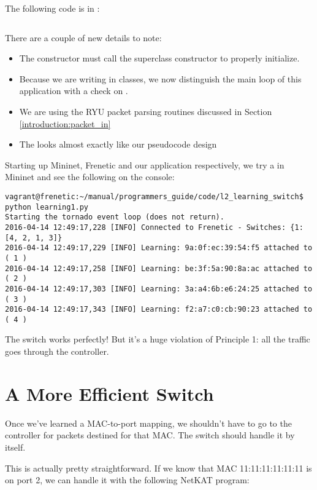 The following code is in :

\inputminted[linenos]{python}{code/l2_learning_switch/learning1.py}

There are a couple of new details to note:

\begin{itemize}
\item The  constructor must call the superclass constructor to properly initialize.
\item Because we are writing in classes, we now distinguish the main loop of this application with 
a check on .  
\item We are using the RYU packet parsing routines discussed in Section \ref{introduction:packet_in}
\item The  looks almost exactly like our pseudocode design
\end{itemize}

Starting up Mininet, Frenetic and our application respectively, we try a  in Mininet and see
the following on the console:

\begin{verbatim}
vagrant@frenetic:~/manual/programmers_guide/code/l2_learning_switch$ python learning1.py
Starting the tornado event loop (does not return).
2016-04-14 12:49:17,228 [INFO] Connected to Frenetic - Switches: {1: [4, 2, 1, 3]}
2016-04-14 12:49:17,229 [INFO] Learning: 9a:0f:ec:39:54:f5 attached to ( 1 )
2016-04-14 12:49:17,258 [INFO] Learning: be:3f:5a:90:8a:ac attached to ( 2 )
2016-04-14 12:49:17,303 [INFO] Learning: 3a:a4:6b:e6:24:25 attached to ( 3 )
2016-04-14 12:49:17,343 [INFO] Learning: f2:a7:c0:cb:90:23 attached to ( 4 )
\end{verbatim}

The switch works perfectly!  But it's a huge violation of Principle 1: all the traffic 
goes through the controller.  

\section{A More Efficient Switch}

Once we've learned a MAC-to-port
mapping, we shouldn't have to go to the controller for packets destined for that MAC.  The switch
should handle it by itself.

This is actually pretty straightforward.  If we know that MAC 11:11:11:11:11:11 is on port 2, we
can handle it with the following NetKAT program:

